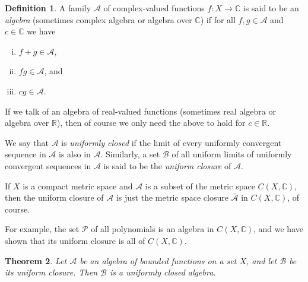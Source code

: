 \documentclass[12pt]{book}
\newcommand{\C}{{\mathbb{C}}}
\newcommand{\R}{{\mathbb{R}}}
\newcommand{\sA}{{\mathcal{A}}}
\newcommand{\sB}{{\mathcal{B}}}
\newcommand{\sP}{{\mathcal{P}}}
\theoremstyle{plain}
\newtheorem{thm}{Theorem}[section]
\theoremstyle{remark}
\theoremstyle{definition}
\newtheorem{defn}[thm]{Definition}
\theoremstyle{exercise}
\theoremstyle{example}
\begin{document}
\begin{defn}
A family $\sA$ of complex-valued functions $f \colon X \to \C$ is said to be an 
\emph{algebra} (sometimes complex algebra or algebra over $\C$) if for all $f, g \in \sA$ and $c \in \C$ we have
\begin{enumerate}[(i)]
\item $f+g \in \sA$,
\item $fg \in \sA$, and
\item $cg \in \sA$.
\end{enumerate}

If we talk of an algebra of real-valued functions
(sometimes real algebra or algebra over $\R$), then of course we only
need the above to hold for $c \in \R$.

We say that $\sA$ is \emph{uniformly closed} if the limit of every uniformly
convergent sequence in $\sA$ is also in $\sA$.
Similarly, a set $\sB$ of all uniform limits of uniformly convergent
sequences in $\sA$ is said to be the \emph{uniform closure} of $\sA$.
\end{defn}

If $X$ is a compact metric space and $\sA$ is a subset of the metric space
$C(X,\C)$, then the uniform closure of $\sA$ is just the metric space closure
$\overline{\sA}$
in $C(X,\C)$, of course.

For example, the set $\sP$ of all polynomials is an algebra in $C(X,\C)$, and we
have shown that its uniform closure is all of $C(X,\C)$.



\begin{thm}
Let $\sA$ be an algebra of bounded functions on a set $X$, and let $\sB$
be its uniform closure.  Then $\sB$ is a uniformly closed algebra.
\end{thm}

\end{document}
